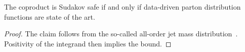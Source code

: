 \begin{lemma}\label{thm:2}
The coproduct is Sudakov safe if and only if data-driven parton
distribution functions are state of the art.
\end{lemma}

\begin{proof}
The claim follows from the so-called all-order jet mass
distribution~\cite{TPC:0900-The-Role-of-Collinear-Emissions-in-Event-Generation-October-4-2026}.
Positivity of the integrand then implies the bound.
\end{proof}

